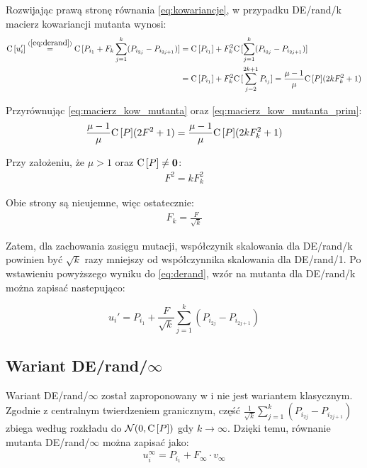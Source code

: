 \documentclass[a4paper,onecolumn,oneside,12pt,wide,floatssmall]{mwrep}
\def\C{{\rm C}\,}
\theoremstyle{definition}
\theoremstyle{plain}%
\theoremstyle{remark}
\begin{document}
Rozwijając prawą stronę równania \eqref{eq:kowariancje}, w przypadku DE/rand/k macierz kowariancji mutanta wynosi:
\begin{equation}
\begin{align}
 \label{eq:macierz_kow_mutanta_prim}
\C[u_i'] \overset{(\ref{eq:derand})}{=} \C[P_{i_1} + F_k\sum\limits_{j=1}^k (P_{i_{2j}} - P_{i_{2j+1}})] 
&= \C[P_{i_1}] + F_k^2\C[\sum\limits_{j=1}^k (P_{i_{2j}} - P_{i_{2j+1}})] \\
&= \C[P_{i_1}] + F_k^2\C[\sum\limits_{j=2}^{2k+1} P_{i_{j}}] = \frac{\mu - 1}{\mu}\C[P](2kF_k^2 + 1)
\end{align}
\end{equation}

Przyrównując \eqref{eq:macierz_kow_mutanta} oraz \eqref{eq:macierz_kow_mutanta_prim}:
\begin{align*}
\frac{\mu - 1}{\mu}\C[P](2F^2 + 1) = \frac{\mu - 1}{\mu}\C[P](2kF_k^2 + 1)
\end{align*}

Przy założeniu, że $\mu > 1$ oraz $\C[P] \neq \textbf{0}$:
\begin{align*}
F^2 = kF_k^2
\end{align*}

Obie strony są nieujemne, więc ostatecznie:
\begin{align*}
F_k = \frac{F}{\sqrt{k}}
\end{align*}

Zatem, dla zachowania zasięgu mutacji, współczynik skalowania dla DE/rand/k powinien być  
$\sqrt{k}$ razy mniejszy od współczynnika skalowania dla DE/rand/1. Po wstawieniu powyższego wyniku
do \eqref{eq:derand}, wzór na mutanta dla DE/rand/k można zapisać nastepująco:

$$ u_i' = P_{i_1} + \frac{F}{\sqrt{k}}\sum\limits_{j=1}^k (P_{i_{2j}} - P_{i_{2j+1}}) $$

\subsection{Wariant DE/rand/$\infty$}
\label{sub:de_rand_inf}

Wariant DE/rand/$\infty$ został zaproponowany w \cite{decomposition} i nie jest wariantem klasycznym.
Zgodnie z centralnym twierdzeniem granicznym, część $\frac{1}{{\sqrt{k}}}\sum\limits_{j=1}^k (P_{i_{2j}} - P_{i_{2j+1}})$ 
zbiega według rozkładu do $\mathcal{N}(0, \C[P])$ gdy $k \to \infty$. 
Dzięki temu, równanie mutanta DE/rand/$\infty$ można zapisać jako:
\begin{align*}
u_i^\infty = P_{i_1} + F_\infty \cdot v_\infty
\end{align*}
\end{document}
